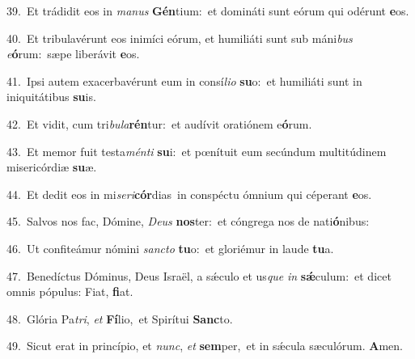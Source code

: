 {\numbfont\textcolor{\numbcolor}{39.}}~Et trádidit eos in \textit{ma}\-\textit{nus} \textbf{Gén}\-tium:~\star et domináti sunt eórum qui odérunt \textbf{e}\-os.\par
{\numbfont\textcolor{\numbcolor}{40.}}~Et tribulavérunt eos inimíci eórum, et humiliáti sunt sub máni\textit{bus} \textit{e}\-\textbf{ó}rum:~\star sæpe liberávit \textbf{e}\-os.\par
{\numbfont\textcolor{\numbcolor}{41.}}~Ipsi autem exacerbavérunt eum in consí\-\textit{li}\-\textit{o} \textbf{su}\-o:~\star et humiliáti sunt in iniquitátibus \textbf{su}\-is.\par
{\numbfont\textcolor{\numbcolor}{42.}}~Et vidit, cum tri\-\textit{bu}\-\textit{la}\textbf{rén}tur:~\star et audívit oratiónem e\-\textbf{ó}\-rum.\par
{\numbfont\textcolor{\numbcolor}{43.}}~Et memor fuit testa\-\textit{mén}\-\textit{ti} \textbf{su}\-i:~\star et pœnítuit eum secúndum multitúdinem misericórdiæ \textbf{su}\-æ.\par
{\numbfont\textcolor{\numbcolor}{44.}}~Et dedit eos in mi\-\textit{se}\-\textit{ri}\textbf{cór}dias~\star in conspéctu ómnium qui céperant \textbf{e}\-os.\par
{\numbfont\textcolor{\numbcolor}{45.}}~Salvos nos fac, Dómine, \textit{De}\-\textit{us} \textbf{nos}\-ter:~\star et cóngrega nos de nati\-\textbf{ó}\-nibus:\par
{\numbfont\textcolor{\numbcolor}{46.}}~Ut confiteámur nómini \textit{sanc}\-\textit{to} \textbf{tu}\-o:~\star et gloriémur in laude \textbf{tu}\-a.\par
{\numbfont\textcolor{\numbcolor}{47.}}~Benedíctus Dóminus, Deus Israël, a sǽculo et us\textit{que} \textit{in} \textbf{sǽ}\-culum:~\star et dicet omnis pópulus: Fiat, \textbf{fi}\-at.\par
{\numbfont\textcolor{\numbcolor}{48.}}~Glória Pa\-\textit{tri}\-, \textit{et} \textbf{Fí}\-lio,~\star et Spirítui \textbf{Sanc}\-to.\par
{\numbfont\textcolor{\numbcolor}{49.}}~Sicut erat in princípio, et \textit{nunc}\-, \textit{et} \textbf{sem}\-per,~\star et in sǽcula sæculórum. \textbf{A}\-men.\par
